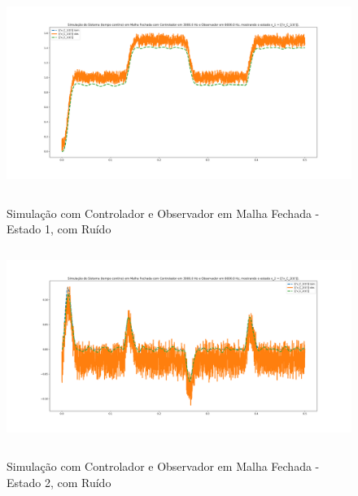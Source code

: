 \documentclass[
	12pt,				%
	article,			%
	openright,			%
	oneside,
	a4paper,			%
	chapter=TITLE,		%
	section=TITLE,		%
	english,			%
	french,				%
	spanish,			%
	brazil,				%
]{abntex2}
\begin{document}
\begin{apendicesenv}
        	\begin{figure}[htbp]
            	\centering
            	\caption{Simulação com Controlador e Observador em Malha Fechada - Estado 1, com Ruído}
            	\includegraphics[width=\textwidth,height=240px,keepaspectratio]{imgs/step_response_closedloop_observer_state1_noise.png}
            	\label{fig-step_response_closedloop_observer_state1_noise}
        	\end{figure}
        	
        	\begin{figure}[htbp]
            	\centering
            	\caption{Simulação com Controlador e Observador em Malha Fechada - Estado 2, com Ruído}
            	\includegraphics[width=\textwidth,height=240px,keepaspectratio]{imgs/step_response_closedloop_observer_state2_noise.png}
            	\label{fig-step_response_closedloop_observer_state2_noise}
        	\end{figure}
        	

\end{apendicesenv}
\end{document}
